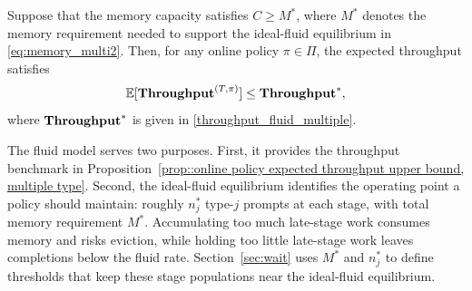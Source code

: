 \begin{proposition}\label{prop::online policy expected throughput upper bound, multiple type}
Suppose that the memory capacity satisfies \(C \geq M^*\), where \(M^*\) denotes the memory requirement needed to support the ideal-fluid equilibrium in \eqref{eq:memory_multi2}. Then, for any online policy \(\pi \in \Pi\), the expected throughput satisfies
\[
\mathbb{E}[\textbf{Throughput}^{(T,\pi)}] \leq \textbf{Throughput}^*,
\]
where \(\textbf{Throughput}^*\) is given in \eqref{throughput_fluid_multiple}.
\end{proposition}
The fluid model serves two purposes. First, it provides the throughput benchmark in Proposition~\ref{prop::online policy expected throughput upper bound, multiple type}. Second, the ideal-fluid equilibrium identifies the operating point a policy should maintain: roughly \(n_j^*\) type-\(j\) prompts at each stage, with total memory requirement \(M^*\). Accumulating too much late-stage work consumes memory and risks eviction, while holding too little late-stage work leaves completions below the fluid rate. Section~\ref{sec:wait} uses \(M^*\) and \(n_j^*\) to define thresholds that keep these stage populations near the ideal-fluid equilibrium.







